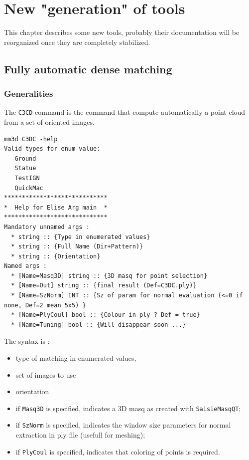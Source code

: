 \chapter{New "generation" of tools}

This chapter describes some new tools, probably their documentation will be reorganized once they are completely stabilized.



\section{Fully automatic dense matching}

\subsection{Generalities}

The {\tt C3CD} command is the command that compute automatically a point cloud from a set of oriented images.

\begin{verbatim}
mm3d C3DC -help
Valid types for enum value:
   Ground
   Statue
   TestIGN
   QuickMac
*****************************
*  Help for Elise Arg main  *
*****************************
Mandatory unnamed args :
  * string :: {Type in enumerated values}
  * string :: {Full Name (Dir+Pattern)}
  * string :: {Orientation}
Named args :
  * [Name=Masq3D] string :: {3D masq for point selection}
  * [Name=Out] string :: {final result (Def=C3DC.ply)}
  * [Name=SzNorm] INT :: {Sz of param for normal evaluation (<=0 if none, Def=2 mean 5x5) }
  * [Name=PlyCoul] bool :: {Colour in ply ? Def = true}
  * [Name=Tuning] bool :: {Will disappear soon ...}
\end{verbatim}


The syntax is :

\begin{itemize}
  \item type of matching in enumerated values,

  \item set of images to use

  \item orientation

  \item if {\tt Masq3D} is specified, indicates a 3D masq as created with {\tt SaisieMasqQT};
  \item if {\tt SzNorm} is specified, indicates the window size parameters for normal extraction in ply file
        (usefull for meshing);
  \item if {\tt PlyCoul} is specified, indicates that coloring of points is required.
\end{itemize}


